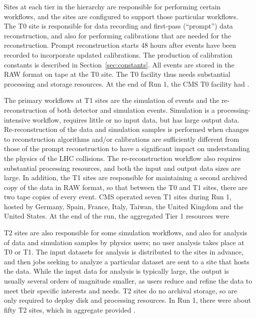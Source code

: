 Sites at each tier in the hierarchy are responsible for performing certain
workflows, and the sites are configured to support those particular
workflows.  The T0 site is responsible for data recording and first-pass
(``prompt'') data reconstruction, and also for performing calibrations that
are needed for the reconstruction.  Prompt reconstruction starts 48 hours
after events have been recorded to incorporate updated calibrations.  The
production of calibration constants is described in
Section~\ref{sec:constants}.  All events are stored in the RAW format on
tape at the T0 site.    The T0 facility thus
needs substantial processing and storage resources.  At the end of Run 1,
the CMS T0 facility had .

The primary workflows at T1 sites are the simulation of events and the
re-reconstruction of both detector and simulation events.  Simulation is a
processing-intensive workflow, requires little or no input data, but has
large output data.  Re-reconstruction of the data and simulation samples is
performed when changes to reconstruction algorithms and/or calibrations are
sufficiently different from those of the prompt reconstruction to have a
significant impact on understanding the physics of the LHC collisions.  The
re-reconstruction workflow also requires substantial processing resources,
and both the input and output data sizes are large.  In addition, the T1
sites are responsible for maintaining a second archived copy of the data in
RAW format, so that between the T0 and T1 sites, there are two tape copies
of every event.  CMS operated seven T1 sites during Run 1, hosted by
Germany, Spain, France, Italy, Taiwan, the United Kingdom and the United
States.  At the end of the run, the aggregated Tier 1 resources were

T2 sites are also responsible for some simulation workflows, and also for
analysis of data and simulation samples by physics users; no user analysis
takes place at T0 or T1.  The input datasets for analysis is distributed to
the sites in advance, and then jobs seeking to analyze a particular dataset
are sent to a site that hosts the data.  While the input data for analysis
is typically large, the output is usually several orders of magnitude
smaller, as users reduce and refine the data to meet their specific
interests and needs.    T2 sites do no archival storage, so are only required to
deploy disk and processing resources.  In Run 1, there were about fifty T2
sites, which in aggregate provided .

